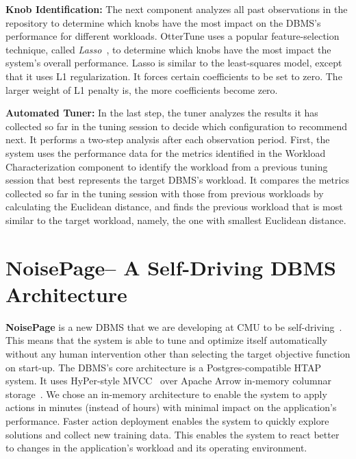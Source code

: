 \documentclass[11pt,times]{article}
\newcommand{\ottertune}{OtterTune\xspace}
\newcommand{\dbmsPostgres}{Postgres\xspace}
\newcommand{\noisepage}{NoisePage\xspace}
\begin{document}
\textbf{Knob Identification:}
The next component analyzes all past observations in the repository
to determine which knobs have the most impact on the DBMS's performance for different workloads.
\ottertune uses a popular feature-selection technique, called \textit{Lasso}~\cite{hastie01}, to 
determine which knobs have the most impact the system's overall performance.
Lasso is similar to the least-squares model, except that it uses L1 regularization. It forces 
certain coefficients to be set to zero. The larger weight of L1 penalty is, the more coefficients 
become zero.
\\ \vspace{-0.1in}

\textbf{Automated Tuner:}
In the last step, the tuner analyzes the results it has collected so far in the tuning session to 
decide which configuration to recommend next. It performs a two-step analysis after each 
observation period. First, the system uses the performance data for the 
metrics identified in the Workload Characterization component to identify the workload from a 
previous tuning session that best represents the target DBMS's workload. It compares the metrics 
collected so far in the tuning session with those from previous workloads by calculating the 
Euclidean distance, and finds the previous workload that is most similar to the target workload, 
namely, the one with smallest Euclidean distance.

\section{\noisepage$ $-- A Self-Driving DBMS Architecture}
\label{sec:selfdriving}
\textbf{\noisepage} is a new DBMS that we are developing at CMU to be 
self-driving~\cite{pavlo17,noisepage}. This means that the system is able to tune and optimize 
itself automatically without any human intervention other than selecting the target objective 
function on start-up. The DBMS's core architecture is a \dbmsPostgres-compatible HTAP system. It 
uses HyPer-style MVCC~\cite{neumann15} over Apache Arrow in-memory 
columnar storage~\cite{li19}.
We chose an in-memory architecture to enable the system to apply actions in minutes (instead of 
hours) with minimal impact on the application's performance. 
Faster action deployment enables the system to quickly explore solutions and collect new training 
data. This enables the system to react better to changes in the application's workload and its 
operating environment. 
\end{document}
